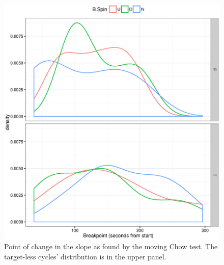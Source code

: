 \documentclass{report}
\begin{document}
\begin{figure}[H]
	\centering
	\includegraphics{FStats_BP_dens.eps}
	\caption{Point of change in the slope as found by the moving Chow test. The target-less cycles' distribution is in the upper panel.\label{FStat_BP_dens}}
\end{figure}
\end{document}
